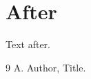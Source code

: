 \documentclass{article}
\begin{document}
\begin{enumerate}
\item Let $S^{x$ hold.
\end{enumerate}
\section{After}
Text after.
\begin{thebibliography}{9}
 A. Author, Title.
\end{thebibliography}
\end{document}
